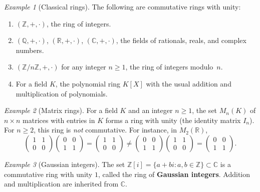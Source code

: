 \documentclass[12pt,a4paper,openany]{book}
\theoremstyle{definition}
\theoremstyle{remark}
\newtheorem{example}{Example}[chapter]
\begin{document}
\begin{example}[Classical rings]\label{ex:classical-rings}
The following are commutative rings with unity:
\begin{enumerate}[label=(\alph*)]
    \item $(\mathbb{Z},+,\cdot)$, the ring of integers.
    \item $(\mathbb{Q},+,\cdot)$, $(\mathbb{R},+,\cdot)$, $(\mathbb{C},+,\cdot)$, the fields of rationals, reals, and complex numbers.
    \item $(\mathbb{Z}/n\mathbb{Z},+,\cdot)$ for any integer $n\geq 1$, the ring of integers modulo~$n$.
    \item For a field $K$, the polynomial ring $K[X]$ with the usual addition and multiplication of polynomials.
\end{enumerate}
\end{example}

\begin{example}[Matrix rings]\label{ex:matrix-ring}
For a field $K$ and an integer $n\geq 1$, the set $M_n(K)$ of $n\times n$ matrices with entries in $K$ forms a ring with unity (the identity matrix $I_n$). For $n\geq 2$, this ring is \emph{not} commutative. For instance, in $M_2(\mathbb{R})$,
\[
    \begin{pmatrix}1&1\\0&0\end{pmatrix}\begin{pmatrix}0&0\\1&1\end{pmatrix}
    = \begin{pmatrix}1&1\\0&0\end{pmatrix}
    \neq
    \begin{pmatrix}0&0\\1&1\end{pmatrix}\begin{pmatrix}1&1\\0&0\end{pmatrix}
    = \begin{pmatrix}0&0\\1&1\end{pmatrix}.
\]
\end{example}

\begin{example}[Gaussian integers]\label{ex:gaussian-integers}
The set $\mathbb{Z}[i]=\{a+bi : a,b\in\mathbb{Z}\}\subset\mathbb{C}$ is a commutative ring with unity $1$, called the ring of \textbf{Gaussian integers}. Addition and multiplication are inherited from $\mathbb{C}$.
\end{example}
\end{document}
